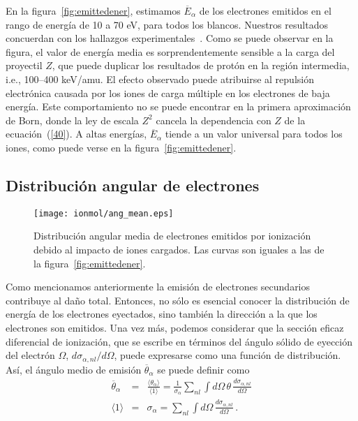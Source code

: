 En la figura~\ref{fig:emittedener}, estimamos $\overline{E}_{\alpha}$ de
los electrones emitidos en el rango de energía de 10 a 70 eV, para 
todos los blancos. Nuestros resultados concuerdan con los hallazgos 
experimentales~\cite{surdutovic2018}. Como se puede observar en la 
figura, el valor de energía media es sorprendentemente sensible a la 
carga del proyectil $Z$, que puede duplicar los resultados de protón en 
la región intermedia, i.e., 100--400 keV/amu. El efecto observado puede 
atribuirse al repulsión electrónica causada por los iones de carga 
múltiple en los electrones de baja energía. Este comportamiento no se 
puede encontrar en la primera aproximación de Born, donde la ley de
escala $Z^2$ cancela la dependencia con $Z$ de la ecuación~(\ref{40}).
A altas energías, $\overline{E}_{\alpha}$ tiende a un valor universal
para todos los iones, como puede verse en la figura~\ref{fig:emittedener}.

\subsection{Distribución angular de electrones}
\label{subsec:meanang}

\begin{figure}
\centering
\texttt{[image: ionmol/ang\_mean.eps]}
\caption[Distribución angular media de electrones emitidos.]
{Distribución angular media de electrones emitidos por ionización debido
al impacto de iones cargados. Las curvas son iguales a las de la 
figura~\ref{fig:emittedener}.}
\label{fig:emittedang}
\end{figure} 

Como mencionamos anteriormente la emisión de electrones secundarios
contribuye al daño total. Entonces, no sólo es esencial conocer la 
distribución de energía de los electrones eyectados, sino también la 
dirección a la que los electrones son emitidos. Una vez más, podemos
considerar que la sección eficaz diferencial de ionización, que se 
escribe en términos del ángulo sólido de eyección del electrón $\Omega$, 
$d\sigma_{\alpha,nl}/d\Omega$, puede expresarse como una función de 
distribución. Así, el ángulo medio de emisión $\overline{\theta}_{\alpha}$ 
se puede definir como
\begin{eqnarray}
\overline{\theta}_{\alpha}&=&\frac{\langle\theta_{\alpha}\rangle}
{\langle 1\rangle}=\frac{1}{\sigma_{\alpha}}\sum\limits_{nl}
\int d\Omega\,\theta\,\frac{d\sigma_{\alpha,nl}}{d\Omega} \\
\langle 1\rangle &=&\sigma_{\alpha}=\sum\limits_{nl}\int d\Omega\,
\frac{d\sigma_{\alpha,nl}}{d\Omega}\,.
\end{eqnarray}

